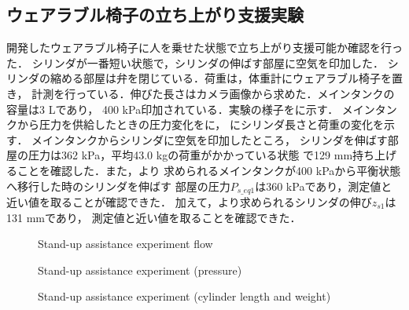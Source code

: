 \subsection{ウェアラブル椅子の立ち上がり支援実験}
        開発したウェアラブル椅子に人を乗せた状態で立ち上がり支援可能か確認を行った．
        シリンダが一番短い状態で，シリンダの伸ばす部屋に空気を印加した．
        シリンダの縮める部屋は弁を閉じている．荷重は，体重計にウェアラブル椅子を置き，
        計測を行っている．伸びた長さはカメラ画像から求めた．メインタンクの容量は3 Lであり，
        400 kPa印加されている．実験の様子をに示す．
        メインタンクから圧力を供給したときの圧力変化をに，
        にシリンダ長さと荷重の変化を示す．
        メインタンクからシリンダに空気を印加したところ，
        シリンダを伸ばす部屋の圧力は362 kPa，平均43.0 kgの荷重がかかっている状態
        で129 mm持ち上げることを確認した．また，より
        求められるメインタンクが400 kPaから平衡状態へ移行した時のシリンダを伸ばす
        部屋の圧力$P_{s\_eq1}$は360 kPaであり，測定値と近い値を取ることが確認できた．
        加えて，より求められるシリンダの伸び$z_{s1}$は131 mmであり，
        測定値と近い値を取ることを確認できた．
        \begin{figure}[t]%
                \begin{center}%
                 \caption{Stand-up assistance experiment flow}%
                \end{center}%
        \end{figure}%
        \begin{figure}[t]%
                \begin{center}%
                 \caption{Stand-up assistance experiment (pressure)}%
                \end{center}%
        \end{figure}%
        \begin{figure}[t]%
                \begin{center}%
                 \caption{Stand-up assistance experiment (cylinder length and weight)}%
                \end{center}%
        \end{figure}%